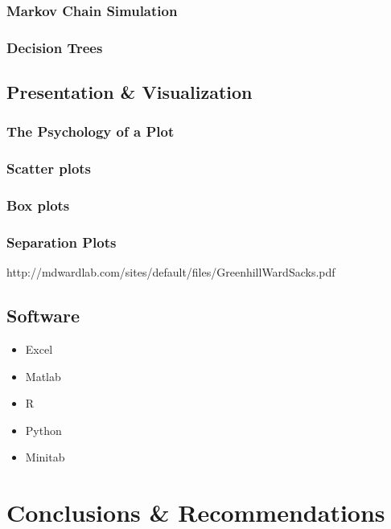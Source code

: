 \documentclass[11pt,a4paper,article]{memoir} %
\begin{document}
\subsection*{Markov Chain Simulation}
\subsection*{Decision Trees}

\section{Presentation \& Visualization}
\subsection{The Psychology of a Plot}
\subsection{Scatter plots}
\subsection{Box plots}
\subsection{Separation Plots}
http://mdwardlab.com/sites/default/files/GreenhillWardSacks.pdf

\section{Software}
\begin{itemize}
\item Excel
\item Matlab
\item R
\item Python
\item Minitab
\end{itemize}

\newpage


\chapter{Conclusions \& Recommendations}

\newpage
\appendix
\end{document}
